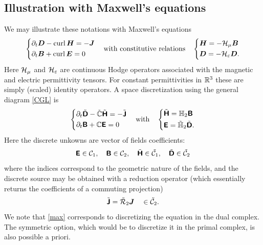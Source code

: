 \documentclass[11pt]{article}
\begin{document}
\subsection{Illustration with Maxwell's equations}
We may illustrate these notations with Maxwell's equations 
\begin{equation} \label{max_cont}
	\left\{\begin{aligned}
		&\partial_t {\boldsymbol D} - \operatorname{curl} {\boldsymbol H} = -{\boldsymbol J}
		\\
		&\partial_t {\boldsymbol B} + \operatorname{curl} {\boldsymbol E} = 0
	\end{aligned}\right.
	\quad \text{with constitutive relations} \quad
	\left\{\begin{aligned}
		&{\boldsymbol H} = -\mathcal{H}_\mu {\boldsymbol B}
		\\
		&{\boldsymbol D} = -\mathcal{H}_{\varepsilon} {\boldsymbol D}.
	\end{aligned}\right.	
\end{equation}
Here $\mathcal{H}_\mu$ and $\mathcal{H}_{\varepsilon}$ are continuous Hodge operators
associated with the magnetic and electric permittivity tensors.
For constant permittivities in $\mathbb{R}^3$ these are simply (scaled) identity operators.
A space discretization using the general diagram \eqref{CGL} is 
\begin{equation} \label{max}
	\left\{\begin{aligned}
		&\partial_t \tilde {{\boldsymbol {\rm \mathsf{D}}}} - \tilde{\mathbb{C}} \tilde {{\boldsymbol {\rm \mathsf{H}}}} = -\tilde{{\boldsymbol {\rm \mathsf{J}}}}
		\\
		&\partial_t {\boldsymbol {\rm \mathsf{B}}} + \mathbb{C} {\boldsymbol {\rm \mathsf{E}}} = 0
	\end{aligned}\right.
	\quad \text{with} \quad
	\left\{\begin{aligned}
		&\tilde {{\boldsymbol {\rm \mathsf{H}}}} = \mathbb{H}_2 {\boldsymbol {\rm \mathsf{B}}}
		\\
		&{\boldsymbol {\rm \mathsf{E}}} = \tilde {\mathbb{H}}_2 \tilde {{\boldsymbol {\rm \mathsf{D}}} }.
	\end{aligned}\right.
\end{equation}
Here the discrete unkowns are vector of fields coefficients:
\begin{equation} \label{unknowns}
{\boldsymbol{\rm \mathsf{E}}} \in \mathcal{C}_1, 
\quad
{\boldsymbol{\rm \mathsf{B}}} \in \mathcal{C}_2, 
\quad
\tilde{{\boldsymbol {\rm \mathsf{H}}}} \in \tilde{\mathcal{C}}_1, 
\quad
\tilde{{\boldsymbol {\rm \mathsf{D}}}} \in \tilde{\mathcal{C}}_2
\end{equation}
where the indices correspond to the geometric nature of the fields,
and the discrete source may be obtained with a reduction operator 
(which essentially returns the coefficients of a commuting projection)
\begin{equation} \label{arrJ}
	\tilde{{\boldsymbol {\rm \mathsf{J}}}} = \tilde{\mathcal{R}}_2 {\boldsymbol J} \quad \in \tilde{\mathcal{C}}_2.
\end{equation}
We note that \eqref{max} corresponds to discretizing the \Ampere{} equation 
in the dual complex. The symmetric option, which would be to discretize it in the 
primal complex, is also possible a priori.
\end{document}
